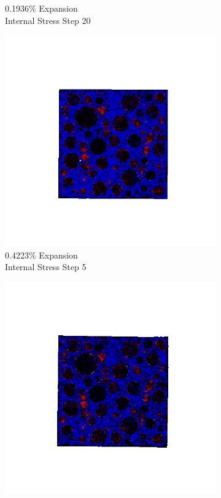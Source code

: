 \begin{figure}[ht!]
\begin{subfigure}{.25\textwidth}
      \caption{0.1936\% Expansion\\Internal Stress Step 20}
    \end{subfigure}
    \begin{subfigure}{.25\textwidth}
      \centering
      \includegraphics[width=1.0\linewidth]{Files/exp_3D/ASR/A30P75_3_s5.png}
      \caption{0.4223\% Expansion\\Internal Stress Step 5}
    \end{subfigure}%
    \begin{subfigure}{.25\textwidth}
      \centering
      \includegraphics[width=1.0\linewidth]{Files/exp_3D/ASR/A30P75_3_s10.png}

\end{subfigure}
\end{figure}
